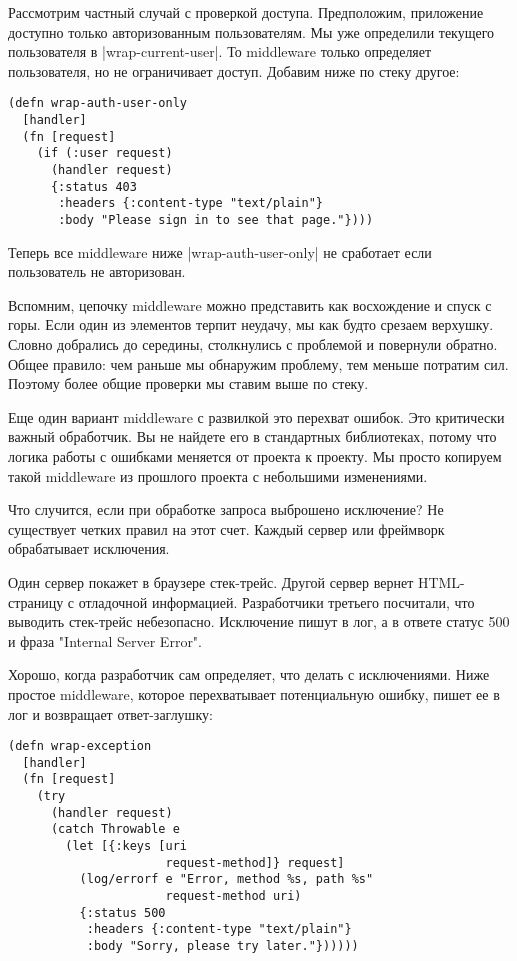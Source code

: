 Рассмотрим частный случай с проверкой доступа. Предположим, приложение доступно
только авторизованным пользователям. Мы уже определили текущего пользователя в
\spverb|wrap-current-user|. То middleware только определяет пользователя, но не
ограничивает доступ. Добавим ниже по стеку другое:

\begin{verbatim}
(defn wrap-auth-user-only
  [handler]
  (fn [request]
    (if (:user request)
      (handler request)
      {:status 403
       :headers {:content-type "text/plain"}
       :body "Please sign in to see that page."})))
\end{verbatim}

Теперь все middleware ниже \spverb|wrap-auth-user-only| не сработает если пользователь
не авторизован.

Вспомним, цепочку middleware можно представить как восхождение и спуск с
горы. Если один из элементов терпит неудачу, мы как будто срезаем
верхушку. Словно добрались до середины, столкнулись с проблемой и повернули
обратно. Общее правило: чем раньше мы обнаружим проблему, тем меньше потратим
сил. Поэтому более общие проверки мы ставим выше по стеку.

Еще один вариант middleware с развилкой это перехват ошибок. Это критически
важный обработчик. Вы не найдете его в стандартных библиотеках, потому что
логика работы с ошибками меняется от проекта к проекту. Мы просто копируем такой
middleware из прошлого проекта с небольшими изменениями.

Что случится, если при обработке запроса выброшено исключение? Не существует
четких правил на этот счет. Каждый сервер или фреймворк обрабатывает исключения.

Один сервер покажет в браузере стек-трейс. Другой сервер вернет HTML-страницу с
отладочной информацией. Разработчики третьего посчитали, что выводить стек-трейс
небезопасно. Исключение пишут в лог, а в ответе статус 500 и фраза "Internal
Server Error".

Хорошо, когда разработчик сам определяет, что делать с исключениями. Ниже
простое middleware, которое перехватывает потенциальную ошибку, пишет ее в лог и
возвращает ответ-заглушку:

\begin{verbatim}
(defn wrap-exception
  [handler]
  (fn [request]
    (try
      (handler request)
      (catch Throwable e
        (let [{:keys [uri
                      request-method]} request]
          (log/errorf e "Error, method %s, path %s"
                      request-method uri)
          {:status 500
           :headers {:content-type "text/plain"}
           :body "Sorry, please try later."})))))
\end{verbatim}

